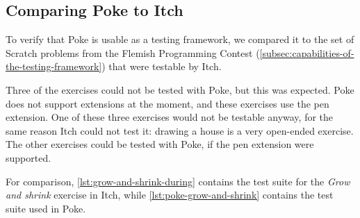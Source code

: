 \documentclass[../main]{subfiles}
\begin{document}
\subsection{Comparing Poke to Itch}\label{subsec:comparing-poke-to-itch}

To verify that Poke is usable as a testing framework, we compared it to the set of Scratch problems from the Flemish Programming Contest (\cref{subsec:capabilities-of-the-testing-framework}) that were testable by Itch.

Three of the exercises could not be tested with Poke, but this was expected.
Poke does not support extensions at the moment, and these exercises use the pen extension.
One of these three exercises would not be testable anyway, for the same reason Itch could not test it: drawing a house is a very open-ended exercise.
The other exercises could be tested with Poke, if the pen extension were supported.

For comparison, \cref{lst:grow-and-shrink-during} contains the test suite for the \emph{Grow and shrink} exercise in Itch, while \cref{lst:poke-grow-and-shrink} contains the test suite used in Poke.
\end{document}
